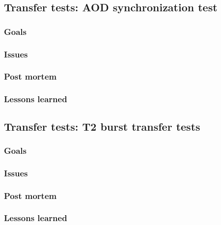 

\subsection{Transfer tests: AOD synchronization test}
\label{sec:test:transfer:aod}

\subsubsection{Goals}
\label{sec:test:transfer:aod:goals}

\subsubsection{Issues}
\label{sec:test:transfer:aod:Issues}

\subsubsection{Post mortem}
\label{sec:test:transfer:aod:postmortem}

\subsubsection{Lessons learned}
\label{sec:test:transfer:aod:lessons}

\subsection{Transfer tests: T2 burst transfer tests}
\label{sec:test:transfer:t2}

\subsubsection{Goals}
\label{sec:test:transfer:t2:goals}

\subsubsection{Issues}
\label{sec:test:transfer:t2:Issues}

\subsubsection{Post mortem}
\label{sec:test:transfer:t2:postmortem}

\subsubsection{Lessons learned}
\label{sec:test:transfer:t2:lessons}

